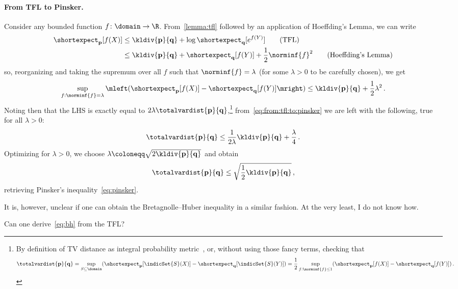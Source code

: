 \documentclass[10pt]{article}
\renewcommand{\eqdef}{\coloneqq}
\newcommand{\p}{\mathbf{p}}
\newcommand{\q}{\mathbf{q}}
\begin{document}
\paragraph{From TFL to Pinsker.} Consider any bounded function $f\colon\domain\to\R$. From~\autoref{lemma:tfl} followed by an application of Hoeffding's Lemma, we can write
\begin{align*}
  \shortexpect_{\p}[f(X)] 
    &\leq \kldiv{\p}{\q} + \log \shortexpect_{\q}[e^{f(Y)}]  \tag{TFL}\\
    &\leq \kldiv{\p}{\q} + \shortexpect_{\q}[f(Y)] + \frac{1}{2}\norminf{f}^2 \tag{Hoeffding's Lemma}
\end{align*}
so, reorganizing and taking the supremum over all $f$ such that $\norminf{f}=\lambda$ (for some $\lambda>0$ to be carefully chosen), we get
\begin{equation}
  \label{eq:from:tfl:to:pinsker}
    \sup_{f: \norminf{f}=\lambda} \mleft( \shortexpect_{\p}[f(X)] - \shortexpect_{\q}[f(Y)] \mright) \leq \kldiv{\p}{\q} + \frac{1}{2}\lambda^2\,.
\end{equation}
Noting then that the LHS is exactly equal to $2\lambda\totalvardist{\p}{\q}$,\footnote{By definition of TV distance as integral probability metric~\cite{Muller97}, or, without using those fancy terms, checking that 
\[
  \totalvardist{\p}{\q} = \sup_{S\subseteq \domain} (\shortexpect_{\p}[\indicSet{S}(X)]-\shortexpect_{\q}[\indicSet{S}(Y)]) = \frac{1}{2}\sup_{f:\norminf{f}\leq 1} (\shortexpect_{\p}[f(X)]-\shortexpect_{\q}[f(Y)])\,.
\]}
from~\eqref{eq:from:tfl:to:pinsker} we are left with the following, true for all $\lambda>0$:
\begin{equation}
  \totalvardist{\p}{\q} \leq \frac{1}{2\lambda}\kldiv{\p}{\q} + \frac{\lambda}{4}\,.
\end{equation}
Optimizing for $\lambda>0$, we choose $\lambda \eqdef \sqrt{2\kldiv{\p}{\q}}$ and obtain
\begin{equation}
  \totalvardist{\p}{\q} \leq \sqrt{\frac{1}{2}\kldiv{\p}{\q}}\,,
\end{equation}
retrieving Pinsker's inequality~\eqref{eq:pinsker}.\smallskip

It is, however, unclear if one can obtain the Bretagnolle--Huber inequality in a similar fashion. At the very least, I do not know how.
\begin{question}
  Can one derive~\eqref{eq:bh} from the TFL?
\end{question}

\end{document}
